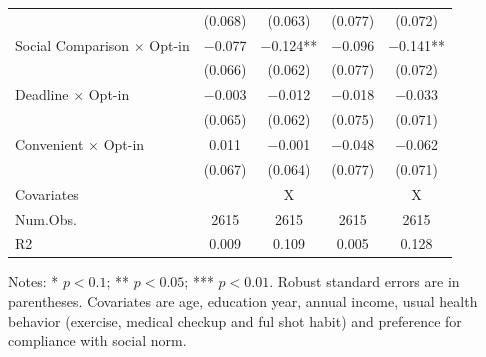 \documentclass[
]{article}
\begin{document}
\begin{table}
\begin{threeparttable}
\begin{tabular}[t]{lcccc}
 & (\num{0.068}) & (\num{0.063}) & (\num{0.077}) & (\num{0.072})\\
Social Comparison $\times$ Opt-in & \num{-0.077} & \num{-0.124}** & \num{-0.096} & \num{-0.141}**\\
 & (\num{0.066}) & (\num{0.062}) & (\num{0.077}) & (\num{0.072})\\
Deadline $\times$ Opt-in & \num{-0.003} & \num{-0.012} & \num{-0.018} & \num{-0.033}\\
 & (\num{0.065}) & (\num{0.062}) & (\num{0.075}) & (\num{0.071})\\
Convenient $\times$ Opt-in & \num{0.011} & \num{-0.001} & \num{-0.048} & \num{-0.062}\\
 & (\num{0.067}) & (\num{0.064}) & (\num{0.077}) & (\num{0.071})\\
\midrule
Covariates &  & X &  & X\\
Num.Obs. & \num{2615} & \num{2615} & \num{2615} & \num{2615}\\
R2 & \num{0.009} & \num{0.109} & \num{0.005} & \num{0.128}\\
\bottomrule
\end{tabular}
\begin{tablenotes}
\item Notes: * $p < 0.1$; ** $p < 0.05$; *** $p < 0.01$. Robust standard errors are in parentheses. Covariates are age, education year, annual income, usual health behavior (exercise, medical checkup and ful shot habit) and preference for compliance with social norm.
\end{tablenotes}
\end{threeparttable}
\end{table}
\end{document}
